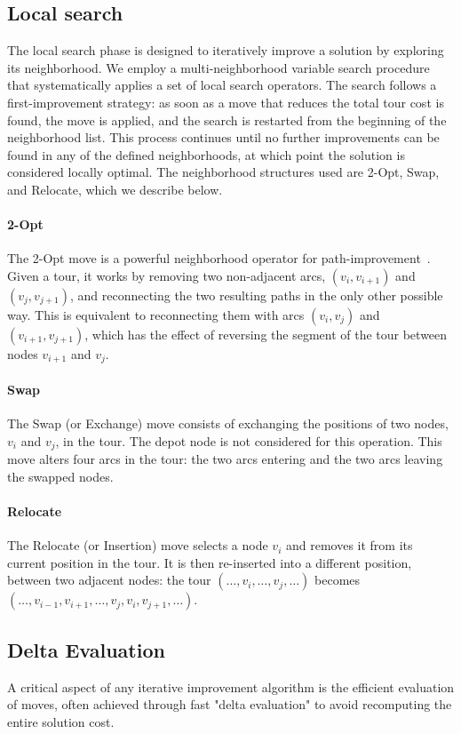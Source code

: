 \documentclass[twocolumn, switch]{article} %
\begin{document}
\subsection{Local search}
The local search phase is designed to iteratively improve a solution by exploring its neighborhood. We employ a multi-neighborhood variable search procedure that systematically applies a set of local search operators. The search follows a first-improvement strategy: as soon as a move that reduces the total tour cost is found, the move is applied, and the search is restarted from the beginning of the neighborhood list.
This process continues until no further improvements can be found in any of the defined neighborhoods, at which point the solution is considered locally optimal. The neighborhood structures used are 2-Opt, Swap, and Relocate, which we describe below.

\paragraph{2-Opt} The 2-Opt move is a powerful neighborhood operator for path-improvement~\cite{Croes1958}. Given a tour, it works by removing two non-adjacent arcs, $(v_i, v_{i+1})$ and $(v_j, v_{j+1})$, and reconnecting the two resulting paths in the only other possible way. This is equivalent to reconnecting them with arcs $(v_i, v_j)$ and $(v_{i+1}, v_{j+1})$, which has the effect of reversing the segment of the tour between nodes $v_{i+1}$ and $v_j$.

\paragraph{Swap} The Swap (or Exchange) move consists of exchanging the positions of two nodes, $v_i$ and $v_j$, in the tour. The depot node is not considered for this operation. This move alters four arcs in the tour: the two arcs entering and the two arcs leaving the swapped nodes.

\paragraph{Relocate} The Relocate (or Insertion) move selects a node $v_i$ and removes it from its current position in the tour. It is then re-inserted into a different position, between two adjacent nodes:
the tour $(\ldots, v_i, \ldots, v_j, \ldots)$ becomes $(\ldots, v_{i-1}, v_{i+1}, \ldots, v_j, v_i, v_{j+1}, \ldots)$.

\subsection{Delta Evaluation}
A critical aspect of any iterative improvement algorithm is the efficient evaluation of moves, often achieved through fast "delta evaluation" to avoid recomputing the entire solution cost.
\end{document}
